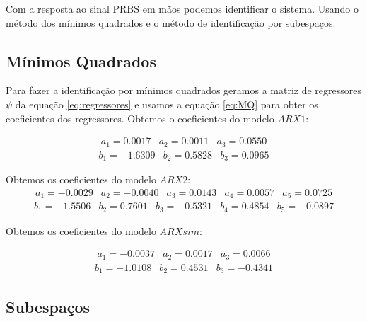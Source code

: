 Com a resposta ao sinal PRBS em mãos podemos identificar o sistema. Usando o método dos mínimos quadrados e o método de identificação por subespaços.

\subsection{Mínimos Quadrados}\label{s:4estmq}
Para fazer a identificação por mínimos quadrados geramos a matriz de regressores $\psi$ da equação \eqref{eq:regressores} e usamos a equação \eqref{eq:MQ} para obter os coeficientes dos regressores. Obtemos o coeficientes do modelo $ARX1$:

\begin{equation}
\begin{matrix}
a_1= 0.0017 &
a_2=0.0011&
a_3=0.0550
\end{matrix}
\end{equation}
\begin{equation}
\begin{matrix}
b_1= -1.6309   &
b_2= 0.5828 &
b_3=   0.0965
\end{matrix}
\end{equation}

Obtemos os coeficientes do modelo $ARX2$:
\begin{equation}
\begin{matrix}
a_1= -0.0029  &
a_2= -0.0040   &
a_3= 0.0143  &
a_4=  0.0057 &
a_5=  0.0725
\end{matrix}
\end{equation}
\begin{equation}
\begin{matrix}
b_1= -1.5506  &
b_2=  0.7601  &
b_3= -0.5321  &
b_4=  0.4854 &
b_5=  -0.0897
\end{matrix}
\end{equation}

Obtemos os coeficientes do modelo $ARXsim$:

\begin{equation}
\begin{matrix}
a_1= -0.0037 &
a_2=  0.0017 &
a_3=   0.0066 
\end{matrix}
\end{equation}
\begin{equation}
\begin{matrix}
b_1=-1.0108   &
b_2= 0.4531  &
b_3= -0.4341
\end{matrix}
\end{equation}


\subsection{Subespaços}\label{s:4estsub}

